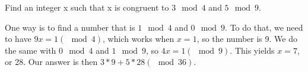 \question Find an integer x such that x is congruent to $3 \mod 4$ and $5 \mod 9$.
\begin{solution}[1 in]
One way is to find a number that is $1 \mod 4$ and $0 \mod 9$. \newline
To do that, we need to have $9x = 1 (\mod 4)$, which works when $x = 1$, so the number is 9. \newline
We do the same with $0 \mod 4$ and $1 \mod 9$, so $4x = 1 (\mod 9)$. This yields $x = 7$, or 28. \newline
Our answer is then $3 * 9 + 5 * 28 (\mod 36)$.
\end{solution}
